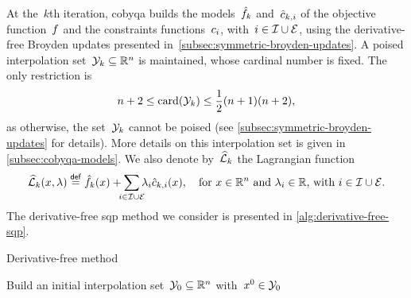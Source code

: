 At the~$k$th iteration, \gls{cobyqa} builds the models~$\objm[k]$ and~$\conm[k]{i}$ of the objective function~$f$ and the constraints functions~$c_{i}$, with~$i \in \mathcal{I} \cup \mathcal{E}$, using the derivative-free Broyden updates presented in~\cref{subsec:symmetric-broyden-updates}.
A poised interpolation set~$\xpt[k] \subseteq \R^n$ is maintained, whose cardinal number is fixed.
The only restriction is
\begin{equation*}
    n + 2 \le \card(\xpt[k]) \le \frac{1}{2} (n + 1) (n + 2),
\end{equation*}
as otherwise, the set~$\xpt[k]$ cannot be poised (see \cref{subsec:symmetric-broyden-updates} for details).
More details on this interpolation set is given in \cref{subsec:cobyqa-models}.
We also denote by~$\lagm[k]$ the Lagrangian function
\begin{equation*}
    \lagm[k](\iter, \lm) \eqdef \objm[k](\iter) + \sum_{\mathclap{i \in \iub \cup \ieq}} \lm_i \conm[k]{i}(\iter), \quad \text{for~$\iter \in \R^n$ and~$\lm_i \in \R$, with~$i \in \iub \cup \ieq$.}
\end{equation*}
The derivative-free \gls{sqp} method we consider is presented in \cref{alg:derivative-free-sqp}.

\begin{algorithm}
    \caption{Derivative-free  method}
    \label{alg:derivative-free-sqp}
    \DontPrintSemicolon
    Build an initial interpolation set~$\xpt[0] \subseteq \R^n$ with~$\iter[0] \in \xpt[0]$\;
\end{algorithm}

